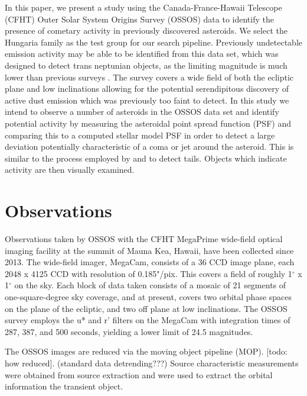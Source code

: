 \documentclass[iop,apj]{emulateapj}
\begin{document}
In this paper, we present a study using the Canada-France-Hawaii Telescope (CFHT) Outer Solar System Origins Survey (OSSOS) data to identify the presence of cometary activity in previously discovered asteroids. We select the Hungaria family as the test group for our search pipeline. Previously undetectable emission activity may be able to be identified from this data set, which was designed to detect trans neptunian objects, as the limiting magnitude is much lower than previous surveys \cite{hsieh15}. The survey covers a wide field of both the ecliptic plane and low inclinations allowing for the potential serendipitous discovery of active dust emission which was previously too faint to detect. In this study we intend to observe a number of asteroids in the OSSOS data set and identify potential activity by measuring the asteroidal point spread function (PSF) and comparing this to a computed stellar model PSF in order to detect a large deviation potentially characteristic of a coma or jet around the asteroid. This is similar to the process employed by \citet*{luu92} and \citet*{sonnett11} to detect tails. Objects which indicate activity are then visually examined. 



\section{Observations}

Observations taken by OSSOS with the CFHT MegaPrime wide-field optical imaging facility  at the summit of Mauna Kea, Hawaii, have been collected since 2013. The wide-field imager, MegaCam, consists of a 36 CCD image plane, each 2048 x 4125 CCD with resolution of 0.185"/pix. This covers a field of  roughly 1$^{\circ}$ x 1$^{\circ}$ on the sky. Each block of data taken consists of a mosaic of 21 segments of one-square-degree sky coverage, and at present, covers two orbital phase spaces on the plane of the ecliptic, and two off plane at low inclinations. The OSSOS survey employs the u* and r' filters on the MegaCam with integration times of 287, 387, and 500 seconds, yielding a lower limit of 24.5 magnitudes.

The OSSOS images are reduced via the moving object pipeline (MOP). [todo: how reduced]. (standard data detrending???) Source characteristic measurements were obtained from source extraction \citep{sep} and were used to extract the orbital information the transient object. 
\end{document}
